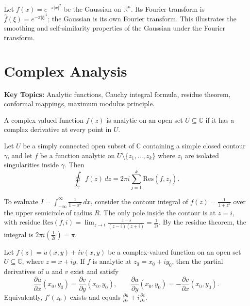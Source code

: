 \begin{example}
Let $f(x) = e^{-\pi |x|^2}$ be the Gaussian on $\mathbb{R}^n$. Its Fourier transform is $\hat{f}(\xi) = e^{-\pi |\xi|^2}$; the Gaussian is its own Fourier transform. This illustrates the smoothing and self-similarity properties of the Gaussian under the Fourier transform.
\end{example}

\section{Complex Analysis}

\textbf{Key Topics:} Analytic functions, Cauchy integral formula, residue theorem, conformal mappings, maximum modulus principle.

\begin{definition}
A complex-valued function $f(z)$ is analytic on an open set $U \subseteq \mathbb{C}$ if it has a complex derivative at every point in $U$.
\end{definition}

\begin{theorem}
Let $U$ be a simply connected open subset of $\mathbb{C}$ containing a simple closed contour $\gamma$, and let $f$ be a function analytic on $U \setminus \{z_1, \dots, z_k\}$ where $z_i$ are isolated singularities inside $\gamma$. Then
\[
\oint_\gamma f(z) \, dz = 2\pi i \sum_{j=1}^k \text{Res}(f, z_j).
\]
\end{theorem}

\begin{example}
To evaluate $I = \int_{-\infty}^\infty \frac{1}{1+x^2} \, dx$, consider the contour integral of $f(z) = \frac{1}{1+z^2}$ over the upper semicircle of radius $R$. The only pole inside the contour is at $z = i$, with residue $\text{Res}(f, i) = \lim_{z \to i} \frac{z-i}{(z-i)(z+i)} = \frac{1}{2i}$. By the residue theorem, the integral is $2\pi i (\frac{1}{2i}) = \pi$.
\end{example}

\begin{definition}
Let $f(z) = u(x,y) + iv(x,y)$ be a complex-valued function on an open set $U \subseteq \mathbb{C}$, where $z = x + iy$. If $f$ is analytic at $z_0 = x_0 + iy_0$, then the partial derivatives of $u$ and $v$ exist and satisfy
\[
\frac{\partial u}{\partial x}(x_0, y_0) = \frac{\partial v}{\partial y}(x_0, y_0), \qquad
\frac{\partial u}{\partial y}(x_0, y_0) = -\frac{\partial v}{\partial x}(x_0, y_0).
\]
Equivalently, $f'(z_0)$ exists and equals $\frac{\partial u}{\partial x} + i\frac{\partial v}{\partial x}$.
\end{definition}

